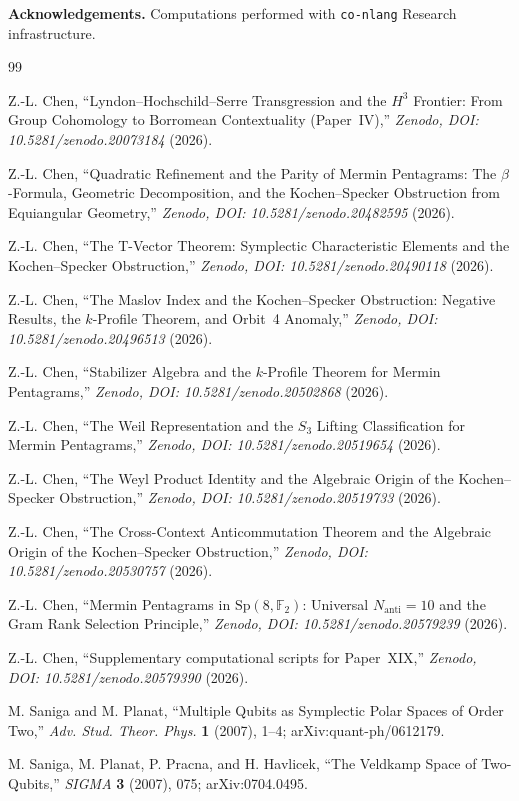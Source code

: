 \documentclass[11pt,a4paper]{article}
\theoremstyle{remark}
\newcommand{\Sp}{\mathrm{Sp}}
\begin{document}
\bigskip
\noindent\textbf{Acknowledgements.}
Computations performed with \texttt{co-nlang} Research infrastructure.

\begin{thebibliography}{99}

Z.-L. Chen,
``Lyndon--Hochschild--Serre Transgression and the $H^3$ Frontier:
From Group Cohomology to Borromean Contextuality (Paper~IV),''
\textit{Zenodo, DOI: 10.5281/zenodo.20073184} (2026).

Z.-L. Chen,
``Quadratic Refinement and the Parity of Mermin Pentagrams:
The $\beta$-Formula, Geometric Decomposition, and the
Kochen--Specker Obstruction from Equiangular Geometry,''
\textit{Zenodo, DOI: 10.5281/zenodo.20482595} (2026).

Z.-L. Chen,
``The T-Vector Theorem: Symplectic Characteristic Elements
and the Kochen--Specker Obstruction,''
\textit{Zenodo, DOI: 10.5281/zenodo.20490118} (2026).

Z.-L. Chen,
``The Maslov Index and the Kochen--Specker Obstruction:
Negative Results, the $k$-Profile Theorem, and Orbit~4 Anomaly,''
\textit{Zenodo, DOI: 10.5281/zenodo.20496513} (2026).

Z.-L. Chen,
``Stabilizer Algebra and the $k$-Profile Theorem for Mermin Pentagrams,''
\textit{Zenodo, DOI: 10.5281/zenodo.20502868} (2026).

Z.-L. Chen,
``The Weil Representation and the $S_3$ Lifting Classification
for Mermin Pentagrams,''
\textit{Zenodo, DOI: 10.5281/zenodo.20519654} (2026).

Z.-L. Chen,
``The Weyl Product Identity and the Algebraic Origin
of the Kochen--Specker Obstruction,''
\textit{Zenodo, DOI: 10.5281/zenodo.20519733} (2026).

Z.-L. Chen,
``The Cross-Context Anticommutation Theorem
and the Algebraic Origin of the Kochen--Specker Obstruction,''
\textit{Zenodo, DOI: 10.5281/zenodo.20530757} (2026).

Z.-L. Chen,
``Mermin Pentagrams in $\Sp(8,\mathbb{F}_2)$:
Universal $N_{\mathrm{anti}}=10$ and the Gram Rank Selection Principle,''
\textit{Zenodo, DOI: 10.5281/zenodo.20579239} (2026).

Z.-L. Chen,
``Supplementary computational scripts for Paper~XIX,''
\textit{Zenodo, DOI: 10.5281/zenodo.20579390} (2026).

M. Saniga and M. Planat,
``Multiple Qubits as Symplectic Polar Spaces of Order Two,''
\textit{Adv. Stud. Theor. Phys.} \textbf{1} (2007), 1--4;
arXiv:quant-ph/0612179.

M. Saniga, M. Planat, P. Pracna, and H. Havlicek,
``The Veldkamp Space of Two-Qubits,''
\textit{SIGMA} \textbf{3} (2007), 075;
arXiv:0704.0495.

\end{thebibliography}
\end{document}
